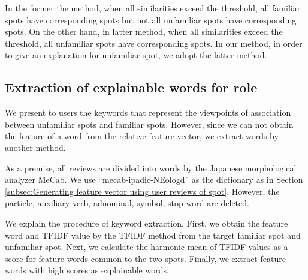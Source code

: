 \documentclass[journal]{IAENGtran}
\begin{document}
In the former the method, when all similarities exceed the threshold, all familiar spots have corresponding spots but not all unfamiliar spots have corresponding spots.
On the other hand, in latter method, when all similarities exceed the threshold, all unfamiliar spots have corresponding spots.
In our method, in order to give an explanation for unfamiliar spot, we adopt the latter method.

\subsection{Extraction of explainable words for role}
\label{subsec:Extraction of explainable words for role}
We present to users the keywords that represent the viewpoints of association between unfamiliar spots and familiar spots.
However, since we can not obtain the feature of a word from the relative feature vector, we extract words by another method.

As a premise, all reviews are divided into words by the Japanese morphological analyzer MeCab.
We use ``mecab-ipadic-NEologd'' as the dictionary as in Section \ref{subsec:Generating feature vector using user reviews of spot}.
However, the particle, auxiliary verb, adnominal, symbol, stop word are deleted.

We explain the procedure of keyword extraction.
First, we obtain the feature word and TFIDF value by the TFIDF method from the target familiar spot and unfamiliar spot.
Next, we calculate the harmonic mean of TFIDF values ​​as a score for feature words common to the two spots.
Finally, we extract feature words with high scores as explainable words.
\end{document}
